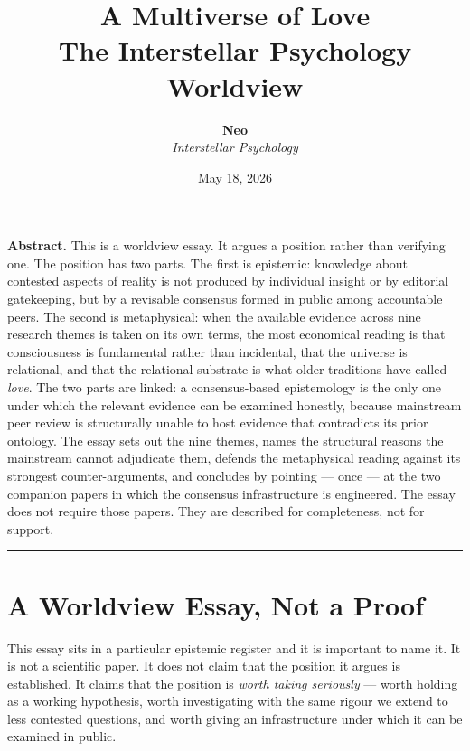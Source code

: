 \documentclass[11pt,a4paper]{article}
\title{
  \vspace{-2em}
  {\Huge\bfseries A Multiverse of Love}\\[0.6em]
  {\Large The Interstellar Psychology Worldview}
}
\author{
  \textbf{Neo}\\[0.3em]
  \textit{Interstellar Psychology}
}
\date{May 18, 2026}
\begin{document}
\maketitle
\thispagestyle{empty}

\vspace{-1em}
\begin{plainbox}
\textbf{Abstract.}
This is a worldview essay. It argues a position rather than verifying
one. The position has two parts. The first is epistemic: knowledge
about contested aspects of reality is not produced by individual
insight or by editorial gatekeeping, but by a revisable consensus
formed in public among accountable peers. The second is metaphysical:
when the available evidence across nine research themes is taken on
its own terms, the most economical reading is that consciousness is
fundamental rather than incidental, that the universe is relational,
and that the relational substrate is what older traditions have
called \emph{love}. The two parts are linked: a consensus-based
epistemology is the only one under which the relevant evidence can
be examined honestly, because mainstream peer review is structurally
unable to host evidence that contradicts its prior ontology. The
essay sets out the nine themes, names the structural reasons the
mainstream cannot adjudicate them, defends the metaphysical reading
against its strongest counter-arguments, and concludes by pointing
--- once --- at the two companion papers in which the consensus
infrastructure is engineered. The essay does not require those
papers. They are described for completeness, not for support.
\end{plainbox}

\tableofcontents
\vspace{1em}
\hrule
\vspace{1em}

\section{A Worldview Essay, Not a Proof}

This essay sits in a particular epistemic register and it is
important to name it. It is not a scientific paper. It does not
claim that the position it argues is established. It claims that
the position is \emph{worth taking seriously} --- worth holding as
a working hypothesis, worth investigating with the same rigour we
extend to less contested questions, and worth giving an
infrastructure under which it can be examined in public.
\end{document}
